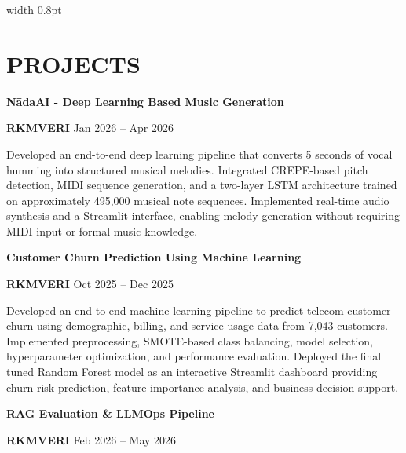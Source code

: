 \documentclass[a4paper,9pt]{article}
\begin{document}
\hfill
\hspace{0.2em}
{\color{myblue}\vrule width 0.8pt}
\hspace{0.2em}
\hfill
\begin{minipage}[t]{0.58\textwidth}

\section{PROJECTS}

\textbf{\color{myblue}NādaAI - Deep Learning Based Music Generation}
\hfill
\href{https://github.com/sayan369369/NadaAI-DL}
{\faGithub}

{\footnotesize\textbf{RKMVERI} \hfill Jan 2026 -- Apr 2026}

Developed an end-to-end deep learning pipeline that converts 5 seconds of vocal humming into structured musical melodies. Integrated CREPE-based pitch detection, MIDI sequence generation, and a two-layer LSTM architecture trained on approximately 495,000 musical note sequences. Implemented real-time audio synthesis and a Streamlit interface, enabling melody generation without requiring MIDI input or formal music knowledge.

\vspace{6pt}

\textbf{\color{myblue}Customer Churn Prediction Using Machine Learning}
\hfill
\href{https://github.com/sayan369369/Customer_Churn_Prediction_using_Machine_Learning}
{\faGithub}

{\footnotesize\textbf{RKMVERI} \hfill Oct 2025 -- Dec 2025}

Developed an end-to-end machine learning pipeline to predict telecom customer churn using demographic, billing, and service usage data from 7,043 customers. Implemented preprocessing, SMOTE-based class balancing, model selection, hyperparameter optimization, and performance evaluation. Deployed the final tuned Random Forest model as an interactive Streamlit dashboard providing churn risk prediction, feature importance analysis, and business decision support.

\vspace{6pt}



\textbf{\color{myblue}RAG Evaluation \& LLMOps Pipeline}
\hfill

{\footnotesize\textbf{RKMVERI} \hfill Feb 2026 -- May 2026}


\end{minipage}
\end{document}
